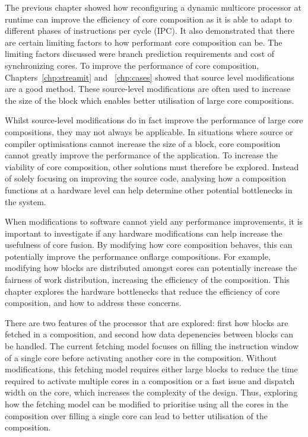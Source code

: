The previous chapter showed how reconfiguring a dynamic multicore processor at runtime can improve the efficiency of core composition as it is able to adapt to different phases of instructions per cycle (IPC).
It also demonstrated that there are certain limiting factors to how performant core composition can be.
The limiting factors discussed were branch prediction requirements and cost of synchronizing cores.
To improve the performance of core composition, Chapters~\ref{chp:streamit} and ~\ref{chp:cases} showed that source level modifications are a good method.
These source-level modifications are often used to increase the size of the block which enables better utilisation of large core compositions.

Whilst source-level modifications do in fact improve the performance of large core compositions, they may not always be applicable.
In situations where source or compiler optimisations cannot increase the size of a block, core composition cannot greatly improve the performance of the application.
To increase the viability of core composition, other solutions must therefore be explored.
Instead of solely focusing on improving the source code, analysing how a composition functions at a hardware level can help determine other potential bottlenecks in the system.

When modifications to software cannot yield any performance improvements, it is important to investigate if any hardware modifications can help increase the usefulness of core fusion.
By modifying how core composition behaves, this can potentially improve the performance onflarge compositions.
For example, modifying how blocks are distributed amongst cores can potentially increase the fairness of work distribution, increasing the efficiency of the composition.
This chapter explores the hardware bottlenecks that reduce the efficiency of core composition, and how to address these concerns.

There are two features of the processor that are explored: first how blocks are fetched in a composition, and second how data depenencies between blocks can be handled.
The current fetching model focuses on filling the instruction window of a single core before activating another core in the composition.
Without modifications, this fetching model requires either large blocks to reduce the time required to activate multiple cores in a composition or a fast issue and dispatch width on the core, which increases the complexity of the design.
Thus, exploring how the fetching model can be modified to prioritise using all the cores in the composition over filling a single core can lead to better utilisation of the composition.

